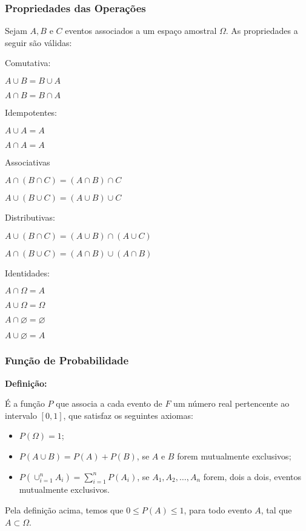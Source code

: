\documentclass[hyperref={pdfpagelabels=false}]{beamer}
\begin{document}
\begin{frame}
\frametitle{Propriedades das Operações}

Sejam $A,B$ e $C$ eventos associados a um espaço amostral $\Omega$. As propriedades a seguir são válidas:
\pause

\begin{enumerate}
	\footnotesize{
	\item Comutativa:
	
	$A \cup B = B \cup A$
	
	$A \cap B = B \cap A$
	\pause
	\item Idempotentes:
	
	$A \cup A = A$
	
	$A \cap A = A$
	\pause
	\item Associativas
	
	$A \cap (B \cap C) = (A \cap B) \cap C$
	
	$A \cup (B \cup C) = (A \cup B) \cup C$
	\pause
	\item Distributivas:
	
	$A \cup (B \cap C) = (A \cup B)\cap (A \cup C)$
	
	$A \cap (B \cup C) = (A \cap B)\cup (A \cap B)$
	\pause
	\item Identidades:
	
	$A \cap \Omega = A$
	
	$A \cup \Omega = \Omega$
	
	$A \cap \varnothing = \varnothing$
	
	$A \cup \varnothing = A$
	}
\end{enumerate}


\end{frame}

\begin{frame}
\frametitle{Função de Probabilidade}

{\bf Definição:}

	É a função $P$ que associa a cada evento de $F$ um número real pertencente ao intervalo $[0,1]$, que satisfaz os seguintes axiomas:\pause
	\begin{itemize}
		\item $P(\Omega) = 1$;
		\pause
		\item $P(A \cup B) = P(A) + P(B)$, se $A$ e $B$ forem mutualmente exclusivos;
		\pause
		\item $P\left(\displaystyle\cup_{i=1}^{n} A_i \right) = \displaystyle \sum_{i = 1}^{n}P(A_i)$, se $A_1,A_2,\dots,A_n$ forem, dois a dois, eventos mutualmente exclusivos.
		\pause
	\end{itemize}
	
	
	Pela definição acima, temos que $0\leq P(A) \leq 1$, para todo evento $A$, tal que $A \subset \Omega$.
\end{frame}
\end{document}
